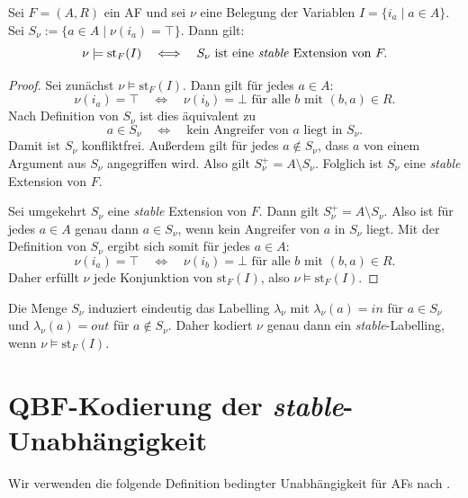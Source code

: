 \begin{Lemma}
    \label{lem:st-pl-correct}
    Sei \(F=(A,R)\) ein AF und sei \(\nu\) eine Belegung der Variablen
    \(I=\{i_a\mid a\in A\}\). Sei \( S_\nu := \{a\in A \mid \nu(i_a)=\top\}.\)
    Dann gilt:
    \[
        \nu \models \mathrm{st}_F(I)
        \quad\Longleftrightarrow\quad
        S_\nu \text{ ist eine \textit{stable} Extension von } F.
    \]
\end{Lemma}

\begin{proof}
    Sei zunächst \(\nu\models \mathrm{st}_F(I)\). Dann gilt für jedes
    \(a\in A\):
    \[
        \nu(i_a)=\top
        \quad\Longleftrightarrow\quad
        \nu(i_b)=\bot
        \text{ für alle } b \text{ mit } (b,a)\in R.
    \]
    Nach Definition von \(S_\nu\) ist dies äquivalent zu
    \[
        a\in S_\nu
        \quad\Longleftrightarrow\quad
        \text{kein Angreifer von }a\text{ liegt in }S_\nu.
    \]
    Damit ist \(S_\nu\) konfliktfrei. Außerdem gilt für jedes
    \(a\notin S_\nu\), dass \(a\) von einem Argument aus \(S_\nu\)
    angegriffen wird. Also gilt \(S_\nu^+ = A\setminus S_\nu.\)
    Folglich ist \(S_\nu\) eine \textit{stable} Extension von \(F\).

    Sei umgekehrt \(S_\nu\) eine \textit{stable} Extension von \(F\).
    Dann gilt \(S_\nu^+=A\setminus S_\nu\). Also ist für jedes
    \(a\in A\) genau dann \(a\in S_\nu\), wenn kein Angreifer von \(a\)
    in \(S_\nu\) liegt. Mit der Definition von \(S_\nu\) ergibt sich
    somit für jedes \(a\in A\):
    \[
        \nu(i_a)=\top
        \quad\Longleftrightarrow\quad
        \nu(i_b)=\bot
        \text{ für alle } b \text{ mit } (b,a)\in R.
    \]
    Daher erfüllt \(\nu\) jede Konjunktion von \(\mathrm{st}_F(I)\), also \(\nu\models \mathrm{st}_F(I).\)
\end{proof}

Die Menge \(S_\nu\) induziert eindeutig das Labelling \(\lambda_\nu\) mit
\(\lambda_\nu(a)=\mathit{in}\) für \(a\in S_\nu\) und
\(\lambda_\nu(a)=\mathit{out}\) für \(a\notin S_\nu\).
Daher kodiert \(\nu\) genau dann ein \textit{stable}-Labelling, wenn
\(\nu\models \mathrm{st}_F(I)\).

\section{QBF-Kodierung der \textit{stable}-Unabhängigkeit}
Wir verwenden die folgende Definition bedingter Unabhängigkeit für AFs nach \citeauthor{rienstra:2020:independence-af}\cite{rienstra:2020:independence-af}.

